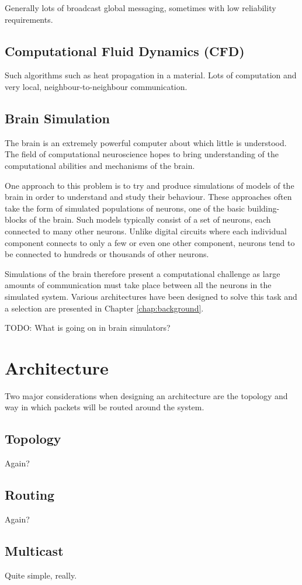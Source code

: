 			Generally lots of broadcast global messaging, sometimes with low
			reliability requirements.
		
		\subsection{Computational Fluid Dynamics (CFD)}
			
			Such algorithms such as heat propagation in a material. Lots of
			computation and very local, neighbour-to-neighbour communication.
		
		\subsection{Brain Simulation}
			
			
			The brain is an extremely powerful computer about which little is
			understood. The field of computational neuroscience hopes to bring
			understanding of the computational abilities and mechanisms of the
			brain.
			
			One approach to this problem is to try and produce simulations of models
			of the brain in order to understand and study their behaviour. These
			approaches often take the form of simulated populations of neurons, one
			of the basic building-blocks of the brain. Such models typically consist
			of a set of neurons, each connected to many other neurons.  Unlike
			digital circuits where each individual component connects to only a few
			or even one other component, neurons tend to be connected to hundreds or
			thousands of other neurons.
			
			
			Simulations of the brain therefore present a computational challenge as
			large amounts of communication must take place between all the neurons
			in the simulated system. Various architectures have been designed to
			solve this task and a selection are presented in Chapter
			\ref{chap:background}.
			
			TODO: What is going on in brain simulators?
	
	\section{Architecture}
		
		Two major considerations when designing an architecture are the topology and
		way in which packets will be routed around the system.
		
		\subsection{Topology}
			
			Again?
		
		\subsection{Routing}
			
			Again?
		
		\subsection{Multicast}
			
			Quite simple, really.

